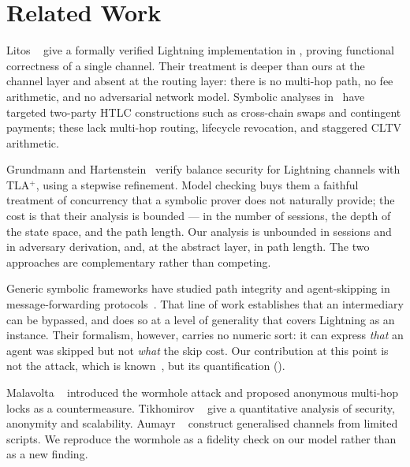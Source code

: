 \section{Related Work}

Litos \etal~\cite{litos2026formally} give a formally verified Lightning
implementation in \mwhy, proving functional correctness of a single channel.
Their treatment is deeper than ours at the channel layer and absent at the
routing layer: there is no multi-hop path, no fee arithmetic, and no
adversarial network model. Symbolic analyses in \mtamarin\ have targeted
two-party HTLC constructions such as cross-chain swaps and contingent payments;
these lack multi-hop routing, lifecycle revocation, and staggered CLTV
arithmetic.

Grundmann and Hartenstein~\cite{grundmann2026security} verify balance security
for Lightning channels with TLA$^+$, using a stepwise refinement. Model
checking buys them a faithful treatment of concurrency that a symbolic prover
does not naturally provide; the cost is that their analysis is bounded --- in
the number of sessions, the depth of the state space, and the path length. Our
analysis is unbounded in sessions and in adversary derivation, and, at the
abstract layer, in path length. The two approaches are complementary rather
than competing.

Generic symbolic frameworks have studied path integrity and agent-skipping in
message-forwarding protocols~\cite{smith2022modelling}. That line of work
establishes that an intermediary can be bypassed, and does so at a level of
generality that covers Lightning as an instance. Their formalism, however,
carries no numeric sort: it can express \emph{that} an agent was skipped but
not \emph{what} the skip cost. Our contribution at this point is not the
attack, which is known~\cite{malavolta2019anonymous}, but its quantification
().

Malavolta \etal~\cite{malavolta2019anonymous} introduced the wormhole attack
and proposed anonymous multi-hop locks as a countermeasure. Tikhomirov
\etal~\cite{tikhomirov2020quantitative} give a quantitative analysis of
security, anonymity and scalability. Aumayr
\etal~\cite{aumayr2021generalized} construct generalised channels from limited
scripts. We reproduce the wormhole as a fidelity check on our model rather than
as a new finding.
